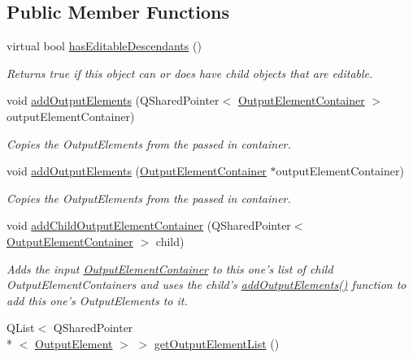 \subsection*{Public Member Functions}
\begin{DoxyCompactItemize}
\item 
virtual bool \hyperlink{class_picto_1_1_output_element_container_a60a3e04e9cb48b5c000c34890c87a234}{has\-Editable\-Descendants} ()
\begin{DoxyCompactList}\small\item\em Returns true if this object can or does have child objects that are editable. \end{DoxyCompactList}\item 
void \hyperlink{class_picto_1_1_output_element_container_a6887ffe6ae5faa914cea3887a310e042}{add\-Output\-Elements} (Q\-Shared\-Pointer$<$ \hyperlink{class_picto_1_1_output_element_container}{Output\-Element\-Container} $>$ output\-Element\-Container)
\begin{DoxyCompactList}\small\item\em Copies the Output\-Elements from the passed in container. \end{DoxyCompactList}\item 
void \hyperlink{class_picto_1_1_output_element_container_a7cb29bd7063ce2240fb00208f6c28221}{add\-Output\-Elements} (\hyperlink{class_picto_1_1_output_element_container}{Output\-Element\-Container} $\ast$output\-Element\-Container)
\begin{DoxyCompactList}\small\item\em Copies the Output\-Elements from the passed in container. \end{DoxyCompactList}\item 
void \hyperlink{class_picto_1_1_output_element_container_a840f8ffeb644964b6169f2500c44d1f2}{add\-Child\-Output\-Element\-Container} (Q\-Shared\-Pointer$<$ \hyperlink{class_picto_1_1_output_element_container}{Output\-Element\-Container} $>$ child)
\begin{DoxyCompactList}\small\item\em Adds the input \hyperlink{class_picto_1_1_output_element_container}{Output\-Element\-Container} to this one's list of child Output\-Element\-Containers and uses the child's \hyperlink{class_picto_1_1_output_element_container_a6887ffe6ae5faa914cea3887a310e042}{add\-Output\-Elements()} function to add this one's Output\-Elements to it. \end{DoxyCompactList}\item 
\hypertarget{class_picto_1_1_output_element_container_af80a8acdfee1b95ca4cc9306fb27e8fe}{Q\-List$<$ Q\-Shared\-Pointer\\*
$<$ \hyperlink{class_picto_1_1_output_element}{Output\-Element} $>$ $>$ \hyperlink{class_picto_1_1_output_element_container_af80a8acdfee1b95ca4cc9306fb27e8fe}{get\-Output\-Element\-List} ()}\label{class_picto_1_1_output_element_container_af80a8acdfee1b95ca4cc9306fb27e8fe}


\end{DoxyCompactItemize}
